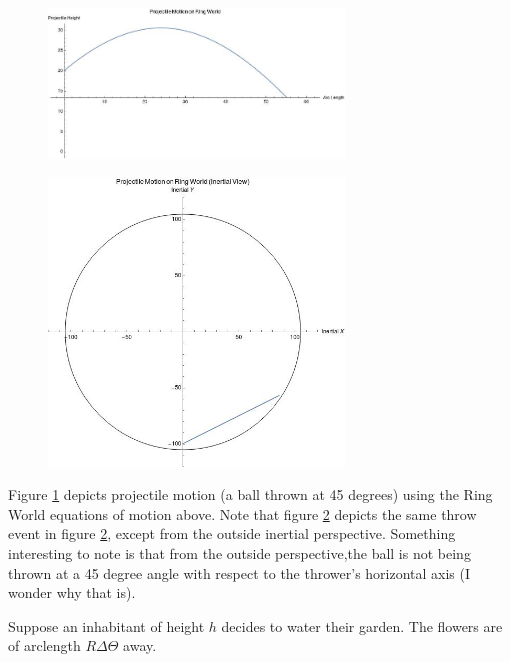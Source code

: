 \documentclass{amsart}
\theoremstyle{definition}
\begin{document}
\begin{figure}[h]
  \centering
  \includegraphics[width=0.7\textwidth]{ArclengthProjectileLabeled.jpg}
  \label{fig:shipview}
  \caption{}
\end{figure}


\begin{figure}[h]
  \centering
  \includegraphics[width=0.7\textwidth]{InertialArclengthProjectileLabeled.jpg}
  \label{fig:inertialview}
  \caption{}
\end{figure}

Figure \ref{fig:shipview} depicts projectile motion (a ball thrown at
45 degrees) using the Ring World equations of motion above. Note that
figure \ref{fig:inertialview} depicts the same throw event in figure
\ref{fig:inertialview}, except from the outside inertial
perspective. Something interesting to note is that from the outside
perspective,the ball is not being thrown at a 45 degree angle with
respect to the thrower's horizontal axis (I wonder why that is).


Suppose an inhabitant of height $h$ decides to water their garden. The flowers are of arclength $R\Delta\Theta$ away. 
\end{document}
